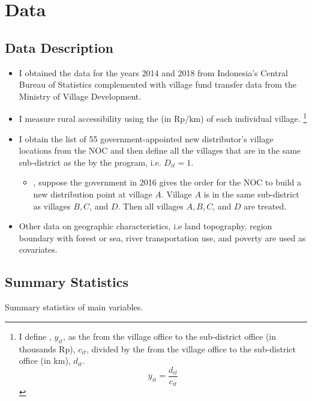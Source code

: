 \documentclass[
11pt,notheorems,compress,hyperref={pdfauthor=Maghfira Ramadhani}
]{beamer}
\begin{document}
\section{Data}
\subsection{Data Description}
\begin{frame}
    \begin{itemize}
        \item I obtained the  data for the years 2014 and 2018 from Indonesia's Central Bureau of Statistics complemented with village fund transfer data from the Ministry of Village Development.
        \item I measure rural accessibility using the  (in Rp/km) of each individual village. 
        \footnote{I define , $y_{it}$, as the  from the village office to the sub-district office (in thousands Rp), $c_{it}$, divided by the  from the village office to the sub-district office (in km), $d_{it}$.
        \begin{equation}
        y_{it}=\frac{d_{it}}{c_{it}}    
        \end{equation}}
        \item I obtain the list of 55 government-appointed new distributor's village locations from the NOC and then define all the villages that are in the same sub-district as the  by the program, i.e. $D_{it}=1$. 
        \begin{itemize}
            \item {}, suppose the government in 2016 gives the order for the NOC to build a new distribution point at village $A$. Village $A$ is in the same sub-district as villages $B,C$, and $D$. Then all villages $A,B,C$, and $D$ are treated.
        \end{itemize}
        \item Other data on geographic characteristics, i.e land topography, region boundary with forest or sea, river transportation use, and poverty are used as covariates.
    \end{itemize}
\end{frame}

\subsection{Summary Statistics}
\begin{frame}
    \begin{table}[h]
    \caption{Summary statistics of main variables. }
    \scalebox{0.75}{}
    \label{t1}\end{table}
\end{frame}
\end{document}
